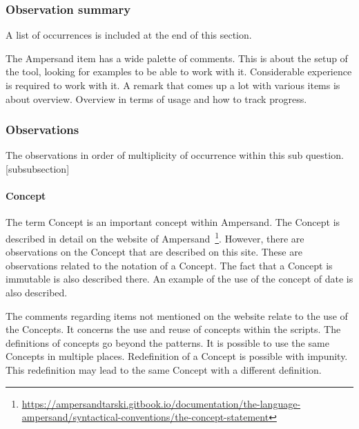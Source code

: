 \subsubsection{Observation summary}
A list of occurrences is included at the end of this section.

The Ampersand item has a wide palette of comments.
This is about the setup of the tool, looking for examples to be able to work with it.
Considerable experience is required to work with it.
A remark that comes up a lot with various items is about overview.
Overview in terms of usage and how to track progress.

\subsubsection{Observations }
The observations in order of multiplicity of occurrence within this sub question.
[subsubsection]
\paragraph{Concept}
The term Concept is an important concept within Ampersand.
The Concept is described in detail on the website of Ampersand~\footnote{\url{https://ampersandtarski.gitbook.io/documentation/the-language-ampersand/syntactical-conventions/the-concept-statement}}.
However, there are observations on the Concept that are described on this site.
These are observations related to the notation of a Concept.
The fact that a Concept is immutable is also described there.
An example of the use of the concept of date is also described.

The comments regarding items not mentioned on the website relate to the use of the Concepts.
It concerns the use and reuse of concepts within the scripts.
The definitions of concepts go beyond the patterns.
It is possible to use the same Concepts in multiple places.
Redefinition of a Concept is possible with impunity.
This redefinition may lead to the same Concept with a different definition.

